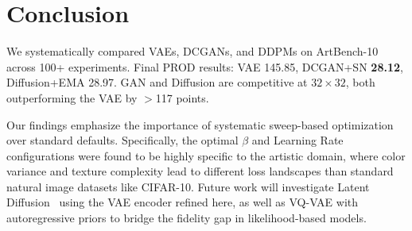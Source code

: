 \documentclass[runningheads]{llncs}
\begin{document}
\section{Conclusion}\label{sec:conclusion}

We systematically compared VAEs, DCGANs, and DDPMs on ArtBench-10 across 100+ experiments. Final PROD results: VAE 145.85, DCGAN+SN \textbf{28.12}, Diffusion+EMA 28.97. GAN and Diffusion are competitive at $32\times 32$, both outperforming the VAE by $>$117 points.

Our findings emphasize the importance of systematic sweep-based optimization over standard defaults. Specifically, the optimal $\beta$ and Learning Rate configurations were found to be highly specific to the artistic domain, where color variance and texture complexity lead to different loss landscapes than standard natural image datasets like CIFAR-10. Future work will investigate Latent Diffusion~\cite{rombach2022} using the VAE encoder refined here, as well as VQ-VAE with autoregressive priors to bridge the fidelity gap in likelihood-based models.
\end{document}
